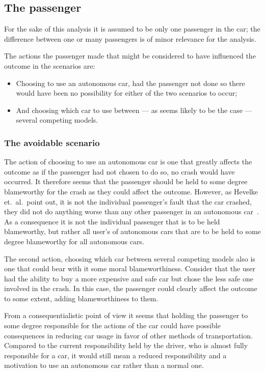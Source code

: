 \subsection{The passenger}\label{sec:passenger}
For the sake of this analysis it is assumed to be only one passenger in the
car; the difference between one or many passengers is of minor relevance for the
analysis.

The actions the passenger made that might be considered to have influenced the
outcome in the scenarios are:
\begin{itemize}
\item Choosing to use an autonomous car, had the passenger not done so there
  would have been no possibility for either of the two scenarios to occur;
\item And choosing which car to use between --- as seems likely to be the case
  --- several competing models.
\end{itemize}

\subsubsection{The avoidable scenario}
The action of choosing to use an autonomous car is one that greatly affects the
outcome as if the passenger had not chosen to do so, no crash would have
occurred. It therefore seems that the passenger should be held to some degree
blameworthy for the crash as they could affect the outcome. However, as Hevelke
et.\ al.\ point out, it is not the individual passenger's fault that the car
crashed, they did not do anything worse than any other passenger in an
autonomous car~\cite{hevelke_2014_responsibility_rfcoavaea}. As a consequence it
is not the individual passenger that is to be held blameworthy, but rather all
user's of autonomous cars that are to be held to some degree blameworthy for all
autonomous cars.

The second action, choosing which car between several competing models also is
one that could bear with it some moral blameworthiness. Consider that the user
had the ability to buy a more expensive and safe car but chose the less safe one
involved in the crash. In this case, the passenger could clearly affect the
outcome to some extent, adding blameworthiness to them.

From a consequentialistic point of view it seems that holding the passenger to
some degree responsible for the actions of the car could have possible
consequences in reducing car usage in favor of other methods of transportation.
Compared to the current responsibility held by the driver, who is almost fully
responsible for a car, it would still mean a reduced responsibility and a
motivation to use an autonomous car rather than a normal one.

